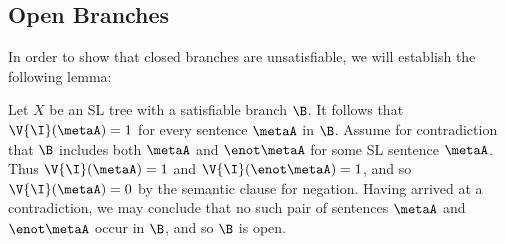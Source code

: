 %
%



\subsection{Open Branches}

In order to show that closed branches are unsatisfiable, we will establish the following lemma:

\label{OpenBranchLemma}

Let $X$ be an SL tree with a satisfiable branch $\B$.
It follows that $\V{\I}(\metaA)=1$ for every sentence $\metaA$ in $\B$.
Assume for contradiction that $\B$ includes both $\metaA$ and $\enot \metaA$ for some SL sentence $\metaA$.
Thus $\V{\I}(\metaA)=1$ and $\V{\I}(\enot\metaA)=1$, and so $\V{\I}(\metaA)=0$ by the semantic clause for negation.
Having arrived at a contradiction, we may conclude that no such pair of sentences $\metaA$ and $\enot \metaA$ occur in $\B$, and so $\B$ is open. 






